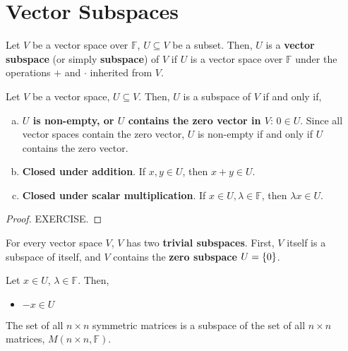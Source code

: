 \documentclass[letterpaper,12pt]{article}
\begin{document}
\section*{Vector Subspaces}
\begin{definition}
Let $V$ be a vector space over $\mathbb{F}$, $U \subseteq V$ be a subset. Then, $U$ is a \textbf{vector subspace} (or simply \textbf{subspace}) of $V$ if $U$ is a vector space over $\mathbb{F}$ under the operations $+$ and $\cdot$ inherited from $V$.
\end{definition}

\begin{theorem}
Let $V$ be a vector space, $U \subseteq V$. Then, $U$ is a subspace of $V$ if and only if,
\begin{enumerate}[(a)]
    \item \textbf{$U$ is non-empty, or $U$ contains the zero vector in $V$}: $0 \in U$. Since all vector spaces contain the zero vector, $U$ is non-empty if and only if $U$ contains the zero vector.
    \item \textbf{Closed under addition}. If $x, y \in U$, then $x + y \in U$.
    \item \textbf{Closed under scalar multiplication}. If $x \in U, \lambda \in \mathbb{F}$, then $\lambda x \in U$.
\end{enumerate}
\end{theorem}

\begin{proof}
EXERCISE.
\end{proof}

\begin{example}
For every vector space $V$, $V$ has two \textbf{trivial subspaces}. First, $V$ itself is a subspace of itself, and $V$ contains the \textbf{zero subspace} $U = \left\{ 0 \right\}$.
\end{example}

\begin{theorem}
Let $x \in U$, $\lambda \in \mathbb{F}$. Then,
\begin{itemize}
    \item $-x \in U$
\end{itemize}
\end{theorem}

\begin{example}
The set of all $n \times n$ symmetric matrices is a subspace of the set of all $n \times n$ matrices, $M(n \times n, \mathbb{F})$.
\end{example}
\end{document}
